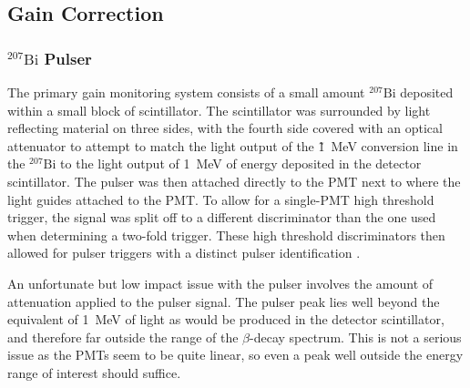 \subsection{Gain Correction}

\subsubsection{$^{207}\mathrm{Bi}$ Pulser}
The primary gain monitoring system consists of a small amount $^{207}\mathrm{Bi}$
deposited within a small block of scintillator. The scintillator was surrounded by
light reflecting material on three sides, with the fourth side covered with an optical
attenuator to attempt to match the light output of the \~1~MeV conversion line in the $^{207}\mathrm{Bi}$
to the light output of 1~MeV of energy deposited in the detector scintillator. The pulser was then
attached directly to the PMT next to where the light guides attached to the PMT.
To allow for a single-PMT high threshold trigger, the signal was split off to a different
discriminator than the one used when determining a two-fold trigger. These high threshold
discriminators then allowed for pulser triggers with a distinct pulser identification \cite{mpmThesis}.

An unfortunate but low impact issue with the pulser involves the amount of attenuation applied to the
pulser signal. The pulser peak lies well beyond the equivalent of 1~MeV of light as would be produced
in the detector scintillator, and therefore far outside the range of the $\beta$-decay spectrum. This
is not a serious issue as the PMTs seem to be quite linear, so even a peak well outside the
energy range of interest should suffice.

